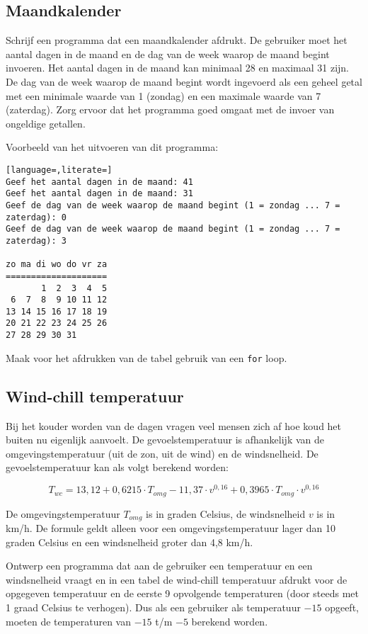 \documentclass[a4paper,10pt,fleqn,twoside]{article}
\begin{document}
\subsection{Maandkalender}
Schrijf een programma dat een maandkalender afdrukt. De gebruiker moet het aantal dagen in de maand en de dag van de week waarop de maand begint invoeren. Het aantal dagen in de maand kan minimaal 28 en maximaal 31 zijn. De dag van de week waarop de maand begint wordt ingevoerd als een geheel getal met een minimale waarde van 1 (zondag) en een maximale waarde van 7 (zaterdag). Zorg ervoor dat het programma goed omgaat met de invoer van ongeldige getallen.

Voorbeeld van het uitvoeren van dit programma:

\begin{lstlisting}[language=,literate=]
Geef het aantal dagen in de maand: 41
Geef het aantal dagen in de maand: 31
Geef de dag van de week waarop de maand begint (1 = zondag ... 7 = zaterdag): 0
Geef de dag van de week waarop de maand begint (1 = zondag ... 7 = zaterdag): 3

zo ma di wo do vr za
====================
       1  2  3  4  5
 6  7  8  9 10 11 12
13 14 15 16 17 18 19
20 21 22 23 24 25 26
27 28 29 30 31
\end{lstlisting}

Maak voor het afdrukken van de tabel gebruik van een \lstinline|for| loop.

\subsection{Wind-chill temperatuur}
Bij het kouder worden van de dagen vragen veel mensen zich af hoe koud het buiten nu eigenlijk aanvoelt. De gevoelstemperatuur is afhankelijk van de omgevingstemperatuur (uit de zon, uit de wind) en de windsnelheid. De gevoelstemperatuur kan als volgt berekend worden:

\begin{equation*}
T_{wc}=13,12 + 0,6215\cdot T_{omg} - 11,37\cdot v^{0,16} + 0,3965\cdot T_{omg}\cdot v^{0,16}
\end{equation*}

De omgevingstemperatuur $T_{omg}$ is in graden Celsius, de windsnelheid $v$ is in km/h. De formule geldt alleen voor een omgevingstemperatuur lager dan 10 graden Celsius en een windsnelheid groter dan 4,8 km/h.

Ontwerp een programma dat aan de gebruiker een temperatuur en een windsnelheid vraagt en in een tabel de wind-chill temperatuur afdrukt voor de opgegeven temperatuur en de eerste 9 opvolgende temperaturen (door steeds met 1 graad Celsius te verhogen). Dus als een gebruiker als temperatuur $-15$ opgeeft, moeten de temperaturen van $-15$ t/m $-5$ berekend worden.
\end{document}
